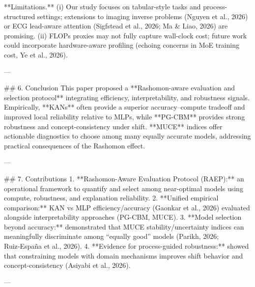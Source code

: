 **Limitations.** (i) Our study focuses on tabular-style tasks and process-structured settings; extensions to imaging inverse problems (Nguyen et al., 2026) or ECG lead-aware attention (Sigfstead et al., 2026; Ma & Liao, 2026) are promising. (ii) FLOPs proxies may not fully capture wall-clock cost; future work could incorporate hardware-aware profiling (echoing concerns in MoE training cost, Ye et al., 2026).

---

## 6. Conclusion  
This paper proposed a **Rashomon-aware evaluation and selection protocol** integrating efficiency, interpretability, and robustness signals. Empirically, **KANs** often provide a superior accuracy–compute tradeoff and improved local reliability relative to MLPs, while **PG-CBM** provides strong robustness and concept-consistency under shift. **MUCE** indices offer actionable diagnostics to choose among many equally accurate models, addressing practical consequences of the Rashomon effect.

---

## 7. Contributions  
1. **Rashomon-Aware Evaluation Protocol (RAEP):** an operational framework to quantify and select among near-optimal models using compute, robustness, and explanation reliability.  
2. **Unified empirical comparison:** KAN vs MLP efficiency/accuracy (Gaonkar et al., 2026) evaluated alongside interpretability approaches (PG-CBM, MUCE).  
3. **Model selection beyond accuracy:** demonstrated that MUCE stability/uncertainty indices can meaningfully discriminate among “equally good” models (Parikh, 2026; Ruiz‑España et al., 2026).  
4. **Evidence for process-guided robustness:** showed that constraining models with domain mechanisms improves shift behavior and concept-consistency (Asiyabi et al., 2026).

---